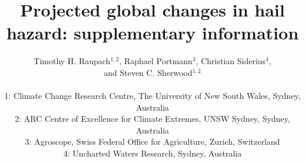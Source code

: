 \documentclass[12pt, titlepage]{article}\usepackage[]{graphicx}\usepackage[]{xcolor}
\title{Projected global changes in hail hazard: supplementary information}
\author{Timothy H. Raupach$^{1,2}$, Raphael Portmann$^{3}$, Christian Siderius$^{4}$, \\and Steven C. Sherwood$^{1,2}$ \\
 \\
 \footnotesize 1: Climate Change Research Centre, The University of New South Wales, Sydney, Australia \\
 \footnotesize 2: ARC Centre of Excellence for Climate Extremes, UNSW Sydney, Sydney, Australia \\
 \footnotesize 3: Agroscope, Swiss Federal Office for Agriculture, Zurich, Switzerland \\
 \footnotesize 4: Uncharted Waters Research, Sydney, Australia
 }
\date{}
\begin{document}
\maketitle






\clearpage
\footnotesize



\end{document}
